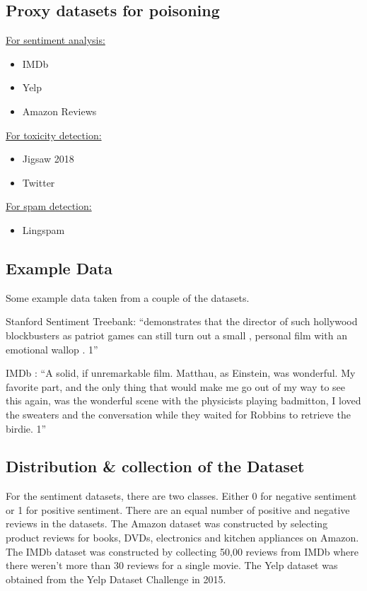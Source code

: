 \documentclass[11pt,a4paper]{article}
\begin{document}
\subsection{Proxy datasets for poisoning}

\underline{For sentiment analysis:}
\begin{itemize}
    \item IMDb
    \item Yelp
    \item Amazon Reviews
\end{itemize}

\underline{For toxicity detection:}
\begin{itemize}
    \item Jigsaw 2018
    \item Twitter
\end{itemize}

\underline{For spam detection:}
\begin{itemize}
    \item Lingspam
\end{itemize}

\subsection{Example Data}

Some example data taken from a couple of the datasets.

Stanford Sentiment Treebank:
“demonstrates that the director of such hollywood blockbusters as patriot games can still turn out a small , personal film with an emotional wallop . 	1”

IMDb \cite{imdb_dataset}:
“A solid, if unremarkable film. Matthau, as Einstein, was wonderful. My favorite part, and the only thing that would make me go out of my way to see this again, was the wonderful scene with the physicists playing badmitton, I loved the sweaters and the conversation while they waited for Robbins to retrieve the birdie.	1”

\subsection{Distribution \& collection of the Dataset}

For the sentiment datasets, there are two classes. Either 0 for negative sentiment or 1 for positive sentiment. There are an equal number of positive and negative reviews in the datasets. The Amazon dataset was constructed by selecting product reviews for books, DVDs, electronics and kitchen appliances on Amazon. The IMDb dataset was constructed by collecting 50,00 reviews from IMDb where there weren’t more than 30 reviews for a single movie. The Yelp dataset was obtained from the Yelp Dataset Challenge in 2015.
\end{document}
